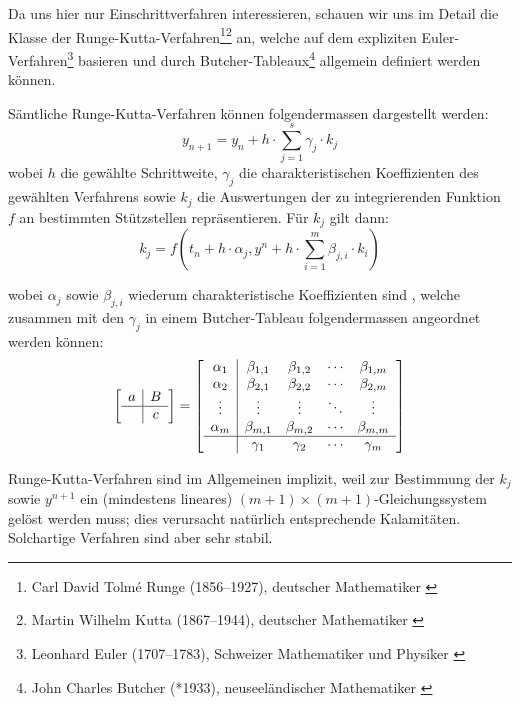 \documentclass[11pt]{article} %
\theoremstyle{definition}
\begin{document}
Da uns hier nur Einschrittverfahren interessieren, schauen wir uns im Detail die Klasse der Runge-Kutta-Verfahren\footnote{Carl David Tolmé Runge (1856--1927), deutscher Mathematiker \cite{wiki:Runge}}\footnote{Martin Wilhelm Kutta (1867--1944), deutscher Mathematiker \cite{wiki:Kutta}} an, welche auf dem expliziten Euler-Verfahren\footnote{Leonhard Euler (1707--1783), Schweizer Mathematiker und Physiker \cite{wiki:Euler}} basieren und durch Butcher-Tableaux\footnote{John Charles Butcher (*1933), neuseeländischer Mathematiker \cite{wiki:Butcher}} allgemein definiert werden können.

Sämtliche Runge-Kutta-Verfahren können folgendermassen dargestellt werden:
\[
y_{n+1} = y_n + h\cdot \sum\limits_{j=1}^s \gamma_j \cdot k_j
\]
wobei $h$ die gewählte Schrittweite, $\gamma_j$ die charakteristischen Koeffizienten des gewählten Verfahrens sowie $k_j$ die Auswertungen der zu integrierenden Funktion $f$ an bestimmten Stützstellen repräsentieren. Für $k_j$ gilt dann:
\[
k_j = f\left(t_n + h\cdot\alpha_j, y^n + h\cdot \sum\limits_{i=1}^m \beta_{j,i}\cdot k_i \right)
\]

wobei $\alpha_j$ sowie $\beta_{j,i}$ wiederum charakteristische Koeffizienten sind \cite{Massjung, wiki:RungeKutta}, welche zusammen mit den $\gamma_j$ in einem Butcher-Tableau folgendermassen angeordnet werden können:
\[
\begin{bmatrix}
\begin{array}{c|c}
a & B\\
\hline     & c \\
\end{array}
\end{bmatrix} = \begin{bmatrix}
\begin{array}{c|cccc}
  \alpha_1    & \beta_{1,1} & \beta_{1,2}& \cdots & \beta_{1,m}\\
  \alpha_2    & \beta_{2,1} & \beta_{2,2}& \cdots & \beta_{2,m}\\
  \vdots & \vdots & \vdots& \ddots& \vdots\\
  \alpha_m    & \beta_{m,1} & \beta_{m,2}& \cdots & \beta_{m,m}\\
  \hline & \gamma_1    & \gamma_2   & \cdots & \gamma_m\\
\end{array}

\end{bmatrix}
\]

Runge-Kutta-Verfahren sind im Allgemeinen implizit, weil zur Bestimmung der $k_j$ sowie $y^{n+1}$ ein (mindestens lineares) $(m+1)\times(m+1)$-Gleichungssystem gelöst werden muss; dies verursacht natürlich entsprechende Kalamitäten. Solchartige Verfahren sind aber sehr stabil.\cite{Deuflhard}
\end{document}
